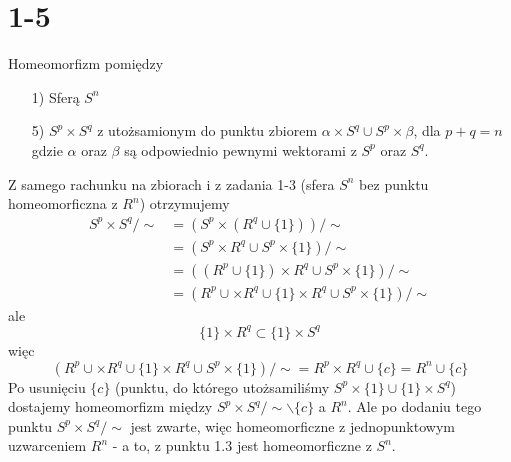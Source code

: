 \newpage
\section*{1-5}
Homeomorfizm pomiędzy
\begin{itemize}
  \item[1)] Sferą $S^n$
  \item[5)] $S^p \times S^q$ z utożsamionym do punktu zbiorem $\alpha \times S^q \cup S^p \times \beta$, dla $p + q = n$ gdzie $\alpha$ oraz $\beta$ są odpowiednio pewnymi wektorami z $S^p$ oraz $S^q$.
\end{itemize}
Z samego rachunku na zbiorach i z zadania 1-3 (sfera $S^n$ bez punktu homeomorficzna z $R^n$) otrzymujemy
\begin{align*}
  S^p \times S^q / \sim  &= (S^p \times (R^q \cup \{1\})) / \sim \\ &= (S^p \times R^q \cup S^p \times \{1\}) / \sim\\ &= ((R^p \cup \{1\}) \times R^q \cup S^p \times \{1\}) / \sim\\& =  (R^p \cup \times R^q \cup \{1\} \times R^q \cup S^p \times \{1\}) / \sim
\end{align*}
ale
$$
\{1\} \times R^q \subset \{1\} \times S^q
$$
więc
$$
(R^p \cup \times R^q \cup \{1\} \times R^q \cup S^p \times \{1\}) / \sim = R^p \times R^q \cup \{c\} = R^n \cup \{c\}
$$
Po usunięciu $\{c\}$ (punktu, do którego utożsamiliśmy $S^p \times \{1\} \cup \{1\} \times S^q$) dostajemy homeomorfizm między $ S^p \times S^q / \sim \backslash \{c\}$  a $ R^n $.
Ale po dodaniu tego punktu $S^p \times S^q / \sim $ jest zwarte, więc homeomorficzne z jednopunktowym uzwarceniem $R^n$ - a to, z punktu 1.3 jest homeomorficzne z $S^n$.
